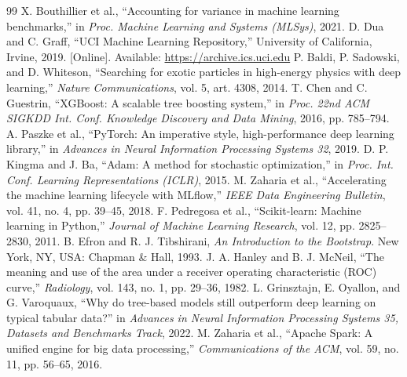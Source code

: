 \documentclass[conference]{IEEEtran}
\begin{document}
\begin{thebibliography}{99}
 X. Bouthillier et al., ``Accounting for variance in machine learning benchmarks,'' in \emph{Proc. Machine Learning and Systems (MLSys)}, 2021.
 D. Dua and C. Graff, ``UCI Machine Learning Repository,'' University of California, Irvine, 2019. [Online]. Available: \url{https://archive.ics.uci.edu}
 P. Baldi, P. Sadowski, and D. Whiteson, ``Searching for exotic particles in high-energy physics with deep learning,'' \emph{Nature Communications}, vol. 5, art. 4308, 2014.
 T. Chen and C. Guestrin, ``XGBoost: A scalable tree boosting system,'' in \emph{Proc. 22nd ACM SIGKDD Int. Conf. Knowledge Discovery and Data Mining}, 2016, pp. 785--794.
 A. Paszke et al., ``PyTorch: An imperative style, high-performance deep learning library,'' in \emph{Advances in Neural Information Processing Systems 32}, 2019.
 D. P. Kingma and J. Ba, ``Adam: A method for stochastic optimization,'' in \emph{Proc. Int. Conf. Learning Representations (ICLR)}, 2015.
 M. Zaharia et al., ``Accelerating the machine learning lifecycle with MLflow,'' \emph{IEEE Data Engineering Bulletin}, vol. 41, no. 4, pp. 39--45, 2018.
 F. Pedregosa et al., ``Scikit-learn: Machine learning in Python,'' \emph{Journal of Machine Learning Research}, vol. 12, pp. 2825--2830, 2011.
 B. Efron and R. J. Tibshirani, \emph{An Introduction to the Bootstrap}. New York, NY, USA: Chapman \& Hall, 1993.
 J. A. Hanley and B. J. McNeil, ``The meaning and use of the area under a receiver operating characteristic (ROC) curve,'' \emph{Radiology}, vol. 143, no. 1, pp. 29--36, 1982.
 L. Grinsztajn, E. Oyallon, and G. Varoquaux, ``Why do tree-based models still outperform deep learning on typical tabular data?'' in \emph{Advances in Neural Information Processing Systems 35, Datasets and Benchmarks Track}, 2022.
 M. Zaharia et al., ``Apache Spark: A unified engine for big data processing,'' \emph{Communications of the ACM}, vol. 59, no. 11, pp. 56--65, 2016.
\end{thebibliography}
\end{document}
